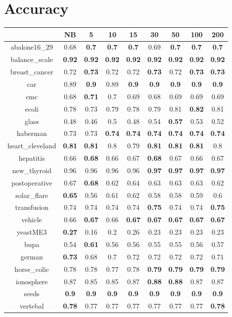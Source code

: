 \documentclass{article}%
\begin{document}
%
\normalsize%
\section*{Accuracy}%
\begin{tabular}{c|cccccccc}%
\hline%
&NB&5&10&15&30&50&100&200\\%
\hline%
abalone16\_29&0.68&\textbf{0.7}&\textbf{0.7}&\textbf{0.7}&0.69&\textbf{0.7}&\textbf{0.7}&\textbf{0.7}\\%
\hline%
balance\_scale&\textbf{0.92}&\textbf{0.92}&\textbf{0.92}&\textbf{0.92}&\textbf{0.92}&\textbf{0.92}&\textbf{0.92}&\textbf{0.92}\\%
\hline%
breast\_cancer&0.72&\textbf{0.73}&0.72&0.72&\textbf{0.73}&0.72&\textbf{0.73}&\textbf{0.73}\\%
\hline%
car&0.89&\textbf{0.9}&0.89&\textbf{0.9}&\textbf{0.9}&\textbf{0.9}&\textbf{0.9}&\textbf{0.9}\\%
\hline%
cmc&0.68&\textbf{0.71}&0.7&0.69&0.68&0.69&0.69&0.69\\%
\hline%
ecoli&0.78&0.73&0.79&0.78&0.79&0.81&\textbf{0.82}&0.81\\%
\hline%
glass&0.48&0.46&0.5&0.48&0.54&\textbf{0.57}&0.53&0.52\\%
\hline%
haberman&0.73&0.73&\textbf{0.74}&\textbf{0.74}&\textbf{0.74}&\textbf{0.74}&\textbf{0.74}&\textbf{0.74}\\%
\hline%
heart\_cleveland&\textbf{0.81}&\textbf{0.81}&0.8&0.79&\textbf{0.81}&\textbf{0.81}&\textbf{0.81}&0.8\\%
\hline%
hepatitis&0.66&\textbf{0.68}&0.66&0.67&\textbf{0.68}&0.67&0.66&0.67\\%
\hline%
new\_thyroid&0.96&0.96&0.96&0.96&\textbf{0.97}&\textbf{0.97}&\textbf{0.97}&\textbf{0.97}\\%
\hline%
postoperative&0.67&\textbf{0.68}&0.62&0.64&0.63&0.63&0.63&0.62\\%
\hline%
solar\_flare&\textbf{0.65}&0.56&0.61&0.62&0.58&0.58&0.59&0.6\\%
\hline%
transfusion&0.74&0.74&0.74&0.74&\textbf{0.75}&0.74&0.74&\textbf{0.75}\\%
\hline%
vehicle&0.66&\textbf{0.67}&0.66&\textbf{0.67}&\textbf{0.67}&\textbf{0.67}&\textbf{0.67}&\textbf{0.67}\\%
\hline%
yeastME3&\textbf{0.27}&0.16&0.2&0.26&0.23&0.23&0.23&0.23\\%
\hline%
bupa&0.54&\textbf{0.61}&0.56&0.56&0.55&0.55&0.56&0.57\\%
\hline%
german&\textbf{0.73}&0.68&0.7&0.72&0.72&0.72&0.72&0.71\\%
\hline%
horse\_colic&0.78&0.78&0.77&0.78&\textbf{0.79}&\textbf{0.79}&\textbf{0.79}&\textbf{0.79}\\%
\hline%
ionosphere&0.87&0.85&0.85&0.87&\textbf{0.88}&\textbf{0.88}&0.87&0.87\\%
\hline%
seeds&\textbf{0.9}&\textbf{0.9}&\textbf{0.9}&\textbf{0.9}&\textbf{0.9}&\textbf{0.9}&\textbf{0.9}&\textbf{0.9}\\%
\hline%
vertebal&\textbf{0.78}&0.77&0.77&0.77&0.77&0.77&0.77&\textbf{0.78}\\%
\hline%
\end{tabular}
\end{document}
